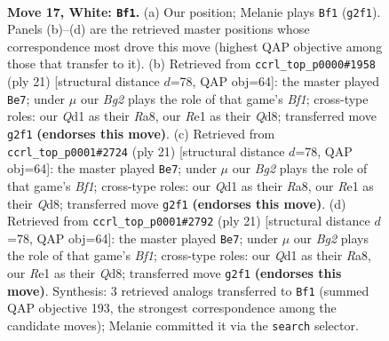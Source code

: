 \documentclass[11pt]{article}
\begin{document}
\clearpage

\begin{figure}[p]\centering
\begin{subfigure}{0.46\textwidth}\centering
\resizebox{\linewidth}{!}{%
\newchessgame
\chessboard[
  setfen={2r1b1k1/p1qrbpp1/npp1pn2/7p/P1NP1P2/1PN3P1/4P1BP/R1BQR1K1 w - - 4 17},
  showmover=false,
  pgfstyle=straightmove, color=movearrow, markmove={g2-f1}
]}
\caption{}
\end{subfigure}\hfill
\begin{subfigure}{0.46\textwidth}\centering
\resizebox{\linewidth}{!}{%
\newchessgame
\chessboard[
  setfen={r1bqkb1r/7p/ppn1ppp1/3p3n/3P3B/P1N1PN2/1P3PPP/R2QKB1R b KQkq - 1 11},
  showmover=false,
  pgfstyle=straightmove, color=movearrow, markmove={f8-e7}
]}
\caption{}
\end{subfigure}
\\[4pt]
\begin{subfigure}{0.46\textwidth}\centering
\resizebox{\linewidth}{!}{%
\newchessgame
\chessboard[
  setfen={r1bqkb1r/7p/ppn1ppp1/3p3n/3P3B/P1N1PN2/1P3PPP/R2QKB1R b KQkq - 1 11},
  showmover=false,
  pgfstyle=straightmove, color=movearrow, markmove={f8-e7}
]}
\caption{}
\end{subfigure}\hfill
\begin{subfigure}{0.46\textwidth}\centering
\resizebox{\linewidth}{!}{%
\newchessgame
\chessboard[
  setfen={r1bqkb1r/7p/ppn1ppp1/3p3n/3P3B/P1N1PN2/1P3PPP/R2QKB1R b KQkq - 1 11},
  showmover=false,
  pgfstyle=straightmove, color=movearrow, markmove={f8-e7}
]}
\caption{}
\end{subfigure}
\caption{\textbf{Move 17, White: \texttt{Bf1}.} (a) Our position; Melanie plays \texttt{Bf1} (\texttt{g2f1}). Panels (b)--(d) are the retrieved master positions whose correspondence most drove this move (highest QAP objective among those that transfer to it). (b) Retrieved from \texttt{ccrl\_top\_p0000\#1958} (ply 21) [structural distance $d$=78, QAP obj=64]: the master played \texttt{Be7}; under $\mu$ our \emph{Bg2} plays the role of that game's \emph{Bf1}; cross-type roles: our \emph{Q}d1 as their \emph{R}a8, our \emph{R}e1 as their \emph{Q}d8; transferred move \texttt{g2f1} \textbf{(endorses this move)}. (c) Retrieved from \texttt{ccrl\_top\_p0001\#2724} (ply 21) [structural distance $d$=78, QAP obj=64]: the master played \texttt{Be7}; under $\mu$ our \emph{Bg2} plays the role of that game's \emph{Bf1}; cross-type roles: our \emph{Q}d1 as their \emph{R}a8, our \emph{R}e1 as their \emph{Q}d8; transferred move \texttt{g2f1} \textbf{(endorses this move)}. (d) Retrieved from \texttt{ccrl\_top\_p0001\#2792} (ply 21) [structural distance $d$=78, QAP obj=64]: the master played \texttt{Be7}; under $\mu$ our \emph{Bg2} plays the role of that game's \emph{Bf1}; cross-type roles: our \emph{Q}d1 as their \emph{R}a8, our \emph{R}e1 as their \emph{Q}d8; transferred move \texttt{g2f1} \textbf{(endorses this move)}. Synthesis: 3 retrieved analogs transferred to \texttt{Bf1} (summed QAP objective 193, the strongest correspondence among the candidate moves); Melanie committed it via the \texttt{search} selector.}
\label{fig:thought-m32}
\end{figure}
\end{document}
